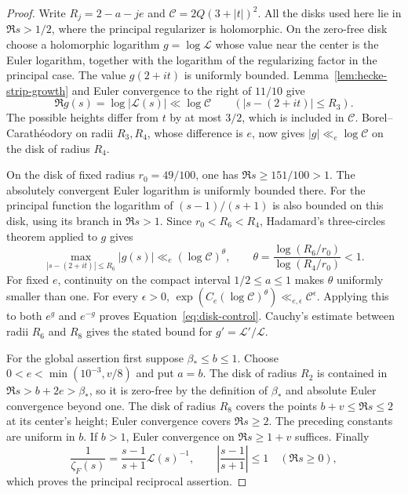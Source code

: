\documentclass[11pt,a4paper]{article}
\numberwithin{equation}{section}
\numberwithin{figure}{section}
\theoremstyle{definition}
\theoremstyle{remark}
\begin{document}
\begin{proof}
Write $R_j=2-a-je$ and $\mathcal C=2Q(3+|t|)^2$.  All the disks used here
lie in $\Re s>1/2$, where the principal regularizer is holomorphic.  On the
zero-free disk choose a holomorphic logarithm $g=\log\mathcal L$ whose value
near the center is the Euler logarithm, together with the logarithm of the
regularizing factor in the principal case.  The value $g(2+it)$ is uniformly
bounded.  Lemma~\ref{lem:hecke-strip-growth} and Euler convergence to the
right of $11/10$ give
\[
 \Re g(s)=\log|\mathcal L(s)|\ll\log\mathcal C
       \qquad(|s-(2+it)|\le R_3).
\]
The possible heights differ from $t$ by at most $3/2$, which is included in
$\mathcal C$.  Borel--Carath\'eodory on radii $R_3,R_4$, whose difference is
$e$, now gives $|g|\ll_e\log\mathcal C$ on the disk of radius $R_4$.

On the disk of fixed radius $r_0=49/100$, one has $\Re s\ge151/100>1$.
The absolutely convergent Euler logarithm is uniformly bounded there.  For
the principal function the logarithm of $(s-1)/(s+1)$ is also bounded on
this disk, using its branch in $\Re s>1$.  Since
$r_0<R_6<R_4$, Hadamard's three-circles theorem applied to $g$ gives
\[
 \max_{|s-(2+it)|\le R_6}|g(s)|
 \ll_e(\log\mathcal C)^\theta,
 \qquad
 \theta=\frac{\log(R_6/r_0)}{\log(R_4/r_0)}<1.
\]
For fixed $e$, continuity on the compact interval $1/2\le a\le1$ makes
$\theta$ uniformly smaller than one.  For every $\epsilon>0$,
$\exp(C_e(\log\mathcal C)^\theta)\ll_{e,\epsilon}\mathcal C^\epsilon$.
Applying this to both $e^g$ and $e^{-g}$ proves
Equation~\eqref{eq:disk-control}.  Cauchy's estimate between radii $R_6$ and
$R_8$ gives the stated bound for $g'=\mathcal L'/\mathcal L$.

For the global assertion first suppose $\beta_*\le b\le1$.  Choose
$0<e<\min(10^{-3},v/8)$ and put $a=b$.  The disk of radius $R_2$ is contained
in $\Re s>b+2e>\beta_*$, so it is zero-free by the definition of $\beta_*$
and absolute Euler convergence beyond one.  The disk of radius $R_8$ covers
the points $b+v\le\Re s\le2$ at its center's height; Euler convergence
covers $\Re s\ge2$.  The preceding constants are uniform in $b$.  If $b>1$,
Euler convergence on $\Re s\ge1+v$ suffices.  Finally
\[
 \frac1{\zeta_F(s)}=\frac{s-1}{s+1}\mathcal L(s)^{-1},
 \qquad \left|\frac{s-1}{s+1}\right|\le1\quad(\Re s\ge0),
\]
which proves the principal reciprocal assertion.
\end{proof}
\end{document}
